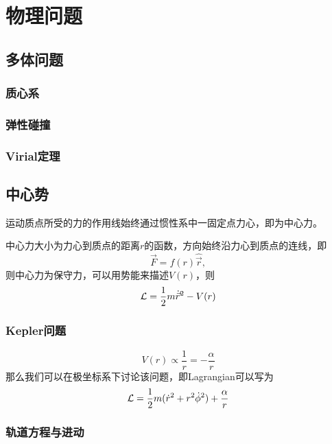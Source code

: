 \part{物理问题}

\chapter{多体问题}

\section{质心系}


\section{弹性碰撞}

\section{Virial定理}


\chapter{中心势}
\label{sec:celestial_pot}
运动质点所受的力的作用线始终通过惯性系中一固定点力心，即为中心力。

中心力大小为力心到质点的距离$r$的函数，方向始终沿力心到质点的连线，即
\begin{equation}
    \vec{F} = f(r)\hat{\vec{r}},
\end{equation}
则中心力为保守力，可以用势能来描述$V(r)$，则
\begin{equation}
    \mathcal{L} = \frac12 m \dot{\vec{r}}^2 - V(r)
\end{equation}


\section{Kepler问题}
\begin{equation}
     V(r)\propto \frac{1}{r} = -\frac{\alpha}{r}
\end{equation}
那么我们可以在极坐标系下讨论该问题，即Lagrangian可以写为
\begin{equation}
    \mathcal{L} = \frac{1}{2}m(\dot r ^2 + r^2\dot \phi^2) + \frac{\alpha}{r}
\end{equation}

\section{轨道方程与进动}

